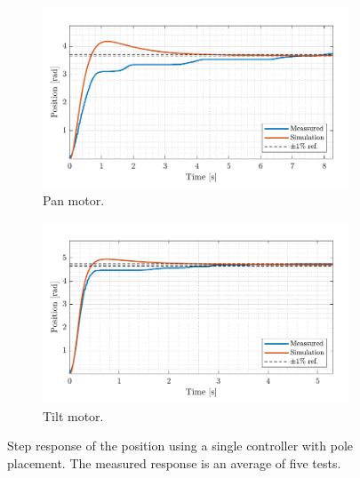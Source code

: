 \documentclass[../../main.tex]{subfiles}
\begin{document}
\begin{figure}[H]
     \centering
     \begin{subfigure}[b]{0.49\textwidth}
         \centering
         \includegraphics[width=\textwidth]{Sections/Test/Images/PoscontrollerTestPan.pdf}
         \caption{Pan motor.}
         \label{fig:StepPanPos}
     \end{subfigure}
     \hfill
     \begin{subfigure}[b]{0.49\textwidth}
         \centering
         \includegraphics[width=\textwidth]{Sections/Test/Images/PoscontrollerTestTilt.pdf}
         \caption{Tilt motor.}
         \label{fig:StepTiltPos}
     \end{subfigure}
        \caption{Step response of the position using a single controller with pole placement. The measured response is an average of five tests.}
        \label{fig:singlePosController}
\end{figure}
\end{document}
